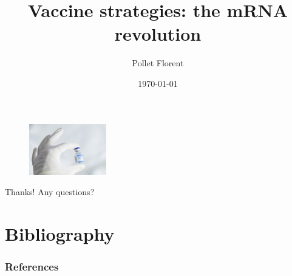 \documentclass[10pt]{beamer}
\title[Vaccine strategies]{Vaccine strategies: the mRNA revolution}
\author[Biology]{Pollet Florent} %
\institute[Mines Paris] %
{
Mines ParisTech \\ %
}
\date{\today} %
\begin{document}
\begin{frame}
\titlepage %
\begin{figure}
    \centering
    \includegraphics[width=0.3\textwidth]{imgs/vaccineCover.jpg}
\end{figure}
\end{frame}







\begin{frame}
    \Huge{\centerline{Thanks! Any questions?}}
\end{frame}


%    
%    
\section*{Bibliography}
\begin{frame}[t,allowframebreaks]
    \frametitle{References}
    \printbibliography
\end{frame}


%
    
    
\end{document}
